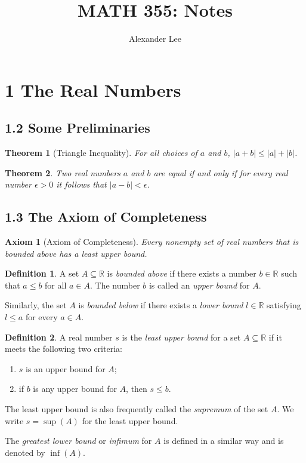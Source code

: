 \documentclass{amsart}
\title{MATH 355: Notes}
\author{Alexander Lee}
\newtheorem*{theorem}{Theorem}
\newtheorem*{axiom}{Axiom}
\theoremstyle{definition}
\newtheorem*{definition}{Definition}
\newcommand{\R}{\mathbb{R}}
\newcommand{\abs}[1]{|#1|}
\begin{document}
\maketitle

\section*{1 The Real Numbers}

\subsection*{1.2 Some Preliminaries}

\begin{theorem}[Triangle Inequality]
  For all choices of $a$ and $b$, $\abs{a + b} \le \abs{a} + \abs{b}$.
\end{theorem}

\begin{theorem}
  Two real numbers $a$ and $b$ are equal if and only if for every real number
  $\epsilon > 0$ it follows that $\abs{a-b} < \epsilon$.
\end{theorem}

\subsection*{1.3 The Axiom of Completeness}

\begin{axiom}[Axiom of Completeness]
  Every nonempty set of real numbers that is bounded above has a least upper
  bound.
\end{axiom}

\begin{definition}
  A set $A \subseteq \R$ is \emph{bounded above} if there exists a number $b \in
  \R$ such that $a \le b$ for all $a \in A$. The number $b$ is called an
  \emph{upper bound} for $A$.

  Similarly, the set $A$ is \emph{bounded below} if there exists a \emph{lower
  bound} $l \in \R$ satisfying $l \le a$ for every $a \in A$.
\end{definition}

\begin{definition}
  A real number $s$ is the \emph{least upper bound} for a set $A \subseteq \R$
  if it meets the following two criteria:
  \begin{enumerate}[label={(\roman*)}]
    \item $s$ is an upper bound for $A$;
    \item if $b$ is any upper bound for $A$, then $s \le b$.
  \end{enumerate}
  The least upper bound is also frequently called the \emph{supremum} of the set
  $A$. We write $s = \sup(A)$ for the least upper bound.

  The \emph{greatest lower bound} or \emph{infimum} for $A$ is defined in a
  similar way and is denoted by $\inf(A)$.
\end{definition}
\end{document}
